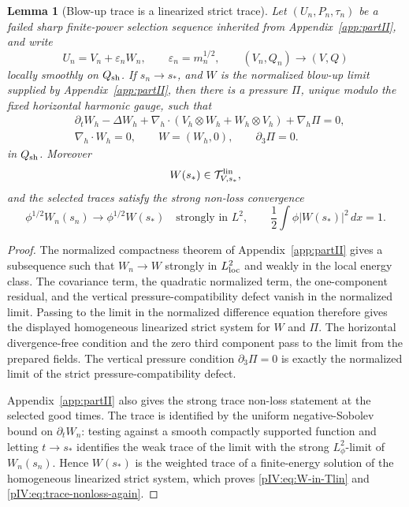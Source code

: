 \documentclass[11pt]{article}
\numberwithin{equation}{section}
\theoremstyle{plain}
\newtheorem{lemma}{Lemma}[section]
\theoremstyle{definition}
\theoremstyle{remark}
\newcommand{\eps}{\varepsilon}
\newcommand{\dx}{\,dx}
\newcommand{\nabh}{\nabla_h}
\newcommand{\divh}{\nabla_h\!\cdot}
\newcommand{\Tlin}{\mathcal T^{\rm lin}}
\begin{document}
\begin{lemma}[Blow-up trace is a linearized strict trace]\label{pIV:lem:A-linearized-trace}
Let \((U_n,P_n,\tau_n)\) be a failed sharp finite-power selection sequence inherited
from Appendix~\ref{app:partII}, and write
\[
        U_n=V_n+\eps_nW_n,\qquad \eps_n=m_n^{1/2},
        \qquad (V_n,Q_n)\to(V,Q)
\]
locally smoothly on \(Q_{\rm sh}\).  If \(s_n\to s_*\), and \(W\) is the normalized
blow-up limit supplied by Appendix~\ref{app:partII}, then there is a pressure \(\Pi\), unique modulo the
fixed horizontal harmonic gauge, such that
\[
\begin{aligned}
        &\partial_t W_h-\Delta W_h
        +\nabh\cdot(V_h\otimes W_h+W_h\otimes V_h)+\nabh\Pi=0,\\
        &\divh W_h=0,
        \qquad W=(W_h,0),
        \qquad \partial_3\Pi=0.
\end{aligned}
\]
in \(Q_{\rm sh}\).  Moreover
\begin{equation}\label{pIV:eq:W-in-Tlin}
        W(s_*)\in \Tlin_{V,s_*},
\end{equation}
and the selected traces satisfy the strong non-loss convergence
\begin{equation}\label{pIV:eq:trace-nonloss-again}
        \phi^{1/2}W_n(s_n)\to \phi^{1/2}W(s_*)
        \quad\text{strongly in }L^2,
        \qquad
        \frac12\int\phi |W(s_*)|^2\dx=1 .
\end{equation}
\end{lemma}

\begin{proof}
The normalized compactness theorem of Appendix~\ref{app:partII} gives a subsequence such that
\(W_n\to W\) strongly in \(L^2_{\rm loc}\) and weakly in the local energy class.  The
covariance term, the quadratic normalized term, the one-component residual, and the
vertical pressure-compatibility defect vanish in the normalized limit.  Passing to the
limit in the normalized difference equation therefore gives the displayed homogeneous
linearized strict system for \(W\) and \(\Pi\).  The horizontal divergence-free condition
and the zero third component pass to the limit from the prepared fields.  The vertical
pressure condition \(\partial_3\Pi=0\) is exactly the normalized limit of the strict
pressure-compatibility defect.

Appendix~\ref{app:partII} also gives the strong trace non-loss statement at the selected good times.
The trace is identified by the uniform negative-Sobolev bound on \(\partial_tW_n\):
testing against a smooth compactly supported function and letting \(t\to s_*\) identifies
the weak trace of the limit with the strong \(L^2_\phi\)-limit of \(W_n(s_n)\).  Hence
\(W(s_*)\) is the weighted trace of a finite-energy solution of the homogeneous
linearized strict system, which proves \eqref{pIV:eq:W-in-Tlin} and
\eqref{pIV:eq:trace-nonloss-again}.
\end{proof}
\end{document}

